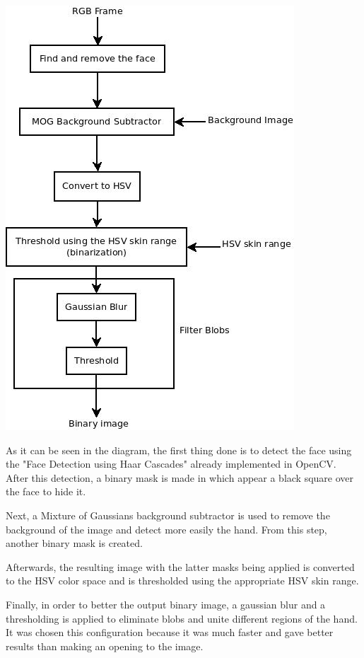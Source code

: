 \documentclass{article}
\begin{document}
\begin{center}
 \includegraphics[scale=0.4]{../hand_filter.jpeg} 
 \end{center} 
 
As it can be seen in the diagram, the first thing done is to detect the face using the "Face Detection using Haar Cascades" already implemented in OpenCV. After this detection, a binary mask is made in which appear a black square over the face to hide it.

Next, a Mixture of Gaussians background subtractor is used to remove the background of the image and detect more easily the hand. From this step, another binary mask is created. 

Afterwards, the resulting image with the latter masks being applied is converted to the HSV color space and is thresholded using the appropriate HSV skin range.

Finally, in order to better the output binary image, a gaussian blur and a thresholding is applied to eliminate blobs and unite different regions of the hand. It was chosen this configuration because it was much faster and gave better results than making an opening to the image. 
\end{document}
